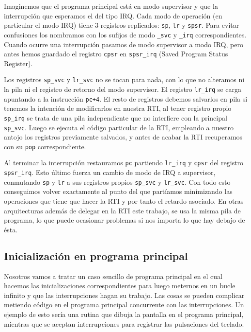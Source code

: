 Imaginemos que el programa principal está en modo supervisor y que la interrupción que
esperamos el del tipo IRQ.
Cada modo de operación (en particular el modo IRQ) tiene 3 registros replicados: {\tt sp}, {\tt lr} y {\tt spsr}.
Para evitar confusiones los nombramos con los sufijos de modo {\tt \_svc} y {\tt \_irq} correspondientes.
Cuando ocurre una interrupción pasamos de modo supervisor a modo IRQ, pero antes hemos guardado
el registro {\tt cpsr} en {\tt spsr\_irq} (Saved Program Status Register).

Los registros {\tt sp\_svc} y {\tt lr\_svc} no se tocan para nada, con lo que no alteramos ni la
pila ni el registro de retorno del modo supervisor. El registro {\tt lr\_irq} se carga apuntando a la
instrucción {\tt pc+4}. El resto de registros debemos salvarlos en pila si tenemos la intención
de modificarlos en nuestra RTI, al tener registro propio {\tt sp\_irq} se trata de una pila
independiente que no interfiere con la principal {\tt sp\_svc}. Luego se ejecuta el código
particular de la RTI, empleando a nuestro antojo los registros previamente salvados, y antes de
acabar la RTI recuperamos con su {\tt pop} correspondiente.

Al terminar la interrupción restauramos {\tt pc} partiendo {\tt lr\_irq} y {\tt cpsr} del registro
{\tt spsr\_irq}. Esto último fuerza un cambio de modo de IRQ a supervisor, conmutando {\tt sp} y {\tt lr}
a sus registros propios {\tt sp\_svc} y {\tt lr\_svc}. Con todo esto conseguimos volver exactamente
al punto del que partíamos minimizando las
operaciones que tiene que hacer la RTI y por tanto el retardo asociado. En otras arquitecturas
además de delegar en la RTI este trabajo, se usa la misma pila de programa, lo que puede
ocasionar problemas si nos importa lo que hay debajo de ésta.

\subsection{Inicialización en programa principal}

Nosotros vamos a tratar un caso sencillo de programa principal en el cual hacemos las
inicializaciones correspondientes para luego meternos en un bucle infinito y que las
interrupciones hagan su trabajo. Las cosas se pueden complicar metiendo código en
el programa principal concurrente con las interrupciones. Un ejemplo de esto sería
una rutina que dibuja la pantalla en el programa principal, mientras que se aceptan
interrupciones para registrar las pulsaciones del teclado.

